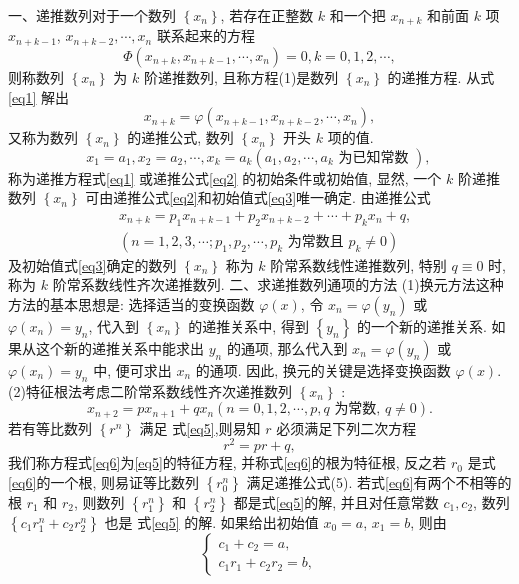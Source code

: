 
一、递推数列对于一个数列 $\left\{x_n\right\}$, 若存在正整数 $k$ 和一个把 $x_{n+k}$ 和前面 $k$ 项 $x_{n+k-1}$, $x_{n+k-2}, \cdots, x_n$ 联系起来的方程
$$
\Phi\left(x_{n+k}, x_{n+k-1}, \cdots, x_n\right)=0, k=0,1,2, \cdots, \label{eq1}
$$
则称数列 $\left\{x_n\right\}$ 为 $k$ 阶递推数列, 且称方程(1)是数列 $\left\{x_n\right\}$ 的递推方程.
从式\ref{eq1} 解出
$$
x_{n+k}=\varphi\left(x_{n+k-1}, x_{n+k-2}, \cdots, x_n\right), \label{eq2}
$$
又称为数列 $\left\{x_n\right\}$ 的递推公式, 数列 $\left\{x_n\right\}$ 开头 $k$ 项的值.
$$
x_1=a_1, x_2=a_2, \cdots, x_k=a_k\left(a_1, a_2, \cdots, a_k \text { 为已知常数 }\right) \text {, } \label{eq3}
$$
称为递推方程式\ref{eq1} 或递推公式\ref{eq2} 的初始条件或初始值, 显然, 一个 $k$ 阶递推数列 $\left\{x_n\right\}$ 可由递推公式\ref{eq2}和初始值式\ref{eq3}唯一确定.
由递推公式
$$
\begin{aligned}
& x_{n+k}=p_1 x_{n+k-1}+p_2 x_{n+k-2}+\cdots+p_k x_n+q, \\
& \left(n=1,2,3, \cdots ; p_1, p_2, \cdots, p_k \text { 为常数且 } p_k \neq 0\right)
\end{aligned}  \label{eq4}
$$
及初始值式\ref{eq3}确定的数列 $\left\{x_n\right\}$ 称为 $k$ 阶常系数线性递推数列, 特别 $q \equiv 0$ 时, 称为 $k$ 阶常系数线性齐次递推数列.
二、求递推数列通项的方法
(1)换元方法这种方法的基本思想是: 选择适当的变换函数 $\varphi(x)$, 令 $x_n=\varphi\left(y_n\right)$ 或 $\varphi\left(x_n\right)=y_n$, 代入到 $\left\{x_n\right\}$ 的递推关系中, 得到 $\left\{y_n\right\}$ 的一个新的递推关系.
如果从这个新的递推关系中能求出 $y_n$ 的通项, 那么代入到 $x_n=\varphi\left(y_n\right)$ 或 $\varphi\left(x_n\right)=y_n$ 中, 便可求出 $x_n$ 的通项.
因此, 换元的关键是选择变换函数 $\varphi(x)$.
(2)特征根法考虑二阶常系数线性齐次递推数列 $\left\{x_n\right\}$ :
$$
x_{n+2}=p x_{n+1}+q x_n(n=0,1,2, \cdots, p, q \text { 为常数, } q \neq 0) . \label{eq5}
$$
若有等比数列 $\left\{r^n\right\}$ 满足 式\ref{eq5},则易知 $r$ 必须满足下列二次方程
$$
r^2=p r+q, \label{eq6}
$$
我们称方程式\ref{eq6}为\ref{eq5}的特征方程, 并称式\ref{eq6}的根为特征根, 反之若 $r_0$ 是式\ref{eq6}的一个根, 则易证等比数列 $\left\{r_0^n\right\}$ 满足递推公式(5).
若式\ref{eq6}有两个不相等的根 $r_1$ 和 $r_2$, 则数列 $\left\{r_1^n\right\}$ 和 $\left\{r_2^n\right\}$ 都是式\ref{eq5}的解, 并且对任意常数 $c_1, c_2$, 数列 $\left\{c_1 r_1^n+c_2 r_2^n\right\}$ 也是 式\ref{eq5} 的解.
如果给出初始值 $x_0=a$, $x_1=b$, 则由
$$
\left\{\begin{array}{l}
c_1+c_2=a, \\
c_1 r_1+c_2 r_2=b,
\end{array}\right.
$$
